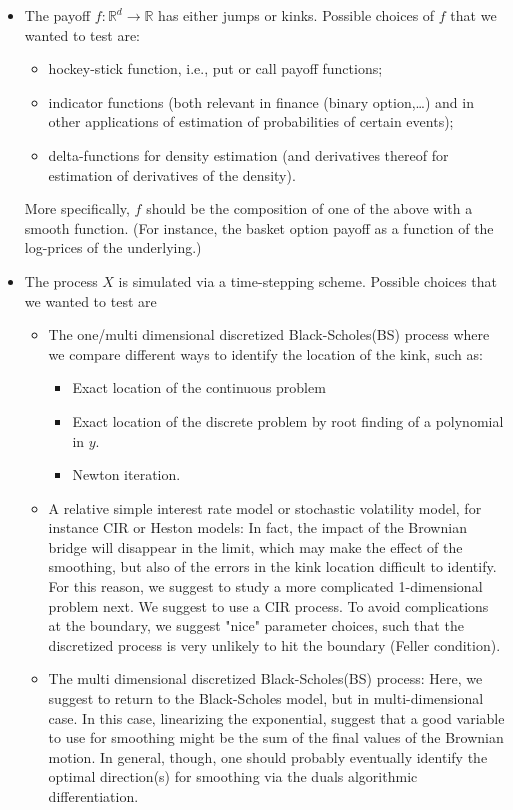 \documentclass[11pt]{article}
\newcommand{\rset}{\mathbb{R}}
\begin{document}
\begin{itemize}
	\item The payoff $f:\rset^d \rightarrow \rset$ has either jumps or kinks. Possible choices of $f$ that we wanted to test are:
	
	\begin{itemize}
		\item hockey-stick function, i.e., put or call payoff functions;
		\item indicator functions (both relevant in finance (binary option,\dots) and in other applications of estimation of probabilities of certain events);
		\item delta-functions for density estimation (and derivatives thereof for	estimation of derivatives of the density).
	\end{itemize}
	More specifically, $f$ should be the composition of one of the above with a smooth function. (For instance, the basket option payoff as a function of the log-prices of the underlying.)
	\item The process $X$ is simulated via a time-stepping scheme. Possible choices that we wanted to test are
		\begin{itemize}
		\item The one/multi dimensional discretized Black-Scholes(BS) process where we compare
		different ways to identify the location of the kink, such as:
		\begin{itemize}
			\item Exact location of the continuous problem
			\item  Exact location of the discrete problem by root  finding of a polynomial in $y$.
			\item Newton iteration.
		\end{itemize}

		\item A relative simple interest rate model or stochastic volatility model, for instance CIR or Heston models: In fact,  the impact of the Brownian bridge will disappear in the limit, which may make the effect of the smoothing, 	but also of the errors in the kink location difficult to identify. For 	this reason, we suggest to study a more complicated 1-dimensional 	problem next. We suggest to use a CIR process. To avoid complications at the boundary, we suggest "nice" parameter choices, such that the discretized process is very unlikely to hit the boundary (Feller
		condition).
		\item The multi dimensional discretized Black-Scholes(BS) process: Here, we suggest to
		return to the Black-Scholes model, but in multi-dimensional case. In this case,	linearizing the exponential, suggest that a good variable to use for smoothing might be the sum of the final values of the Brownian motion.
		In general, though, one should probably eventually identify the	optimal direction(s) for smoothing via the duals algorithmic	differentiation.
	\end{itemize}
\end{itemize}
\end{document}

